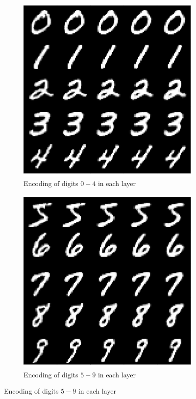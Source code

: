 \documentclass{article}
\begin{document}
\begin{figure}[htbp!]
    \centering
    \begin{subfigure}{.45\textwidth}
        \centering
        \includegraphics[width=\textwidth]{incremental_0-4.png}
        \caption{Encoding of digits $0-4$ in each layer}
        \label{fig:incremental_0-4}
    \end{subfigure}%
    \quad
    \begin{subfigure}{.45\textwidth}
        \centering
        \includegraphics[width=\textwidth]{incremental_5-9.png}
        \caption{Encoding of digits $5-9$ in each layer}
        \label{fig:incremental_5-9}
    \end{subfigure}
\end{figure}
\end{document}
